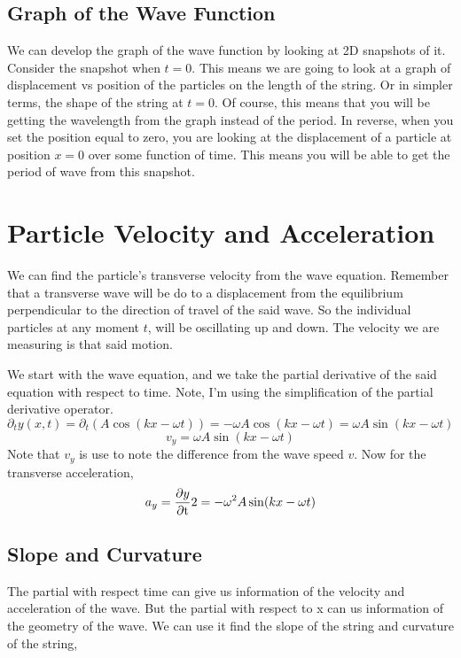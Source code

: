 \subsection{Graph of the Wave Function}
We can develop the graph of the wave function by looking at 2D snapshots of it. Consider the snapshot when $t=0$. This means we are going to look at a graph of displacement vs position of the particles on the length of the string. Or in simpler terms, the shape of the string at $t=0$. Of course, this means that you will be getting the wavelength from the graph instead of the period. In reverse, when you set the position equal to zero, you are looking at the displacement of a particle at position $x=0$ over some function of time. This means you will be able to get the period of wave from this snapshot.

\newpage
\section{Particle Velocity and Acceleration}
We can find the particle's transverse velocity from the wave equation. Remember that a transverse wave will be do to a displacement from the equilibrium perpendicular to the direction of travel of the said wave. So the individual particles at any moment $t$, will be oscillating up and down. The velocity we are measuring is that said motion. 

We start with the wave equation, and we take the partial derivative of the said equation with respect to time. Note, I'm using the simplification of the partial derivative operator.
\begin{equation*}
	\partial_t y(x,t) = \partial_t (A\cos(kx - \omega t)) = - \omega A\cos(kx - \omega t) = \omega A\sin(kx - \omega t)
\end{equation*}
\begin{equation*}
	v_y = \omega A\sin(kx - \omega t)
\end{equation*}
Note that $v_y$ is use to note the difference from the wave speed $v$.
Now for the transverse acceleration,
\begin{align*}
	a_y = \frac{\partial y}{\partial\mathrm{t}}{2} = - \omega^2 A\sin(kx - \omega t)
\end{align*}

\subsection{Slope and Curvature}
The partial with respect time can give us information of the velocity and acceleration of the wave. But the partial with respect to x can us information of the geometry of the wave. We can use it find the slope of the string and curvature of the string, 


